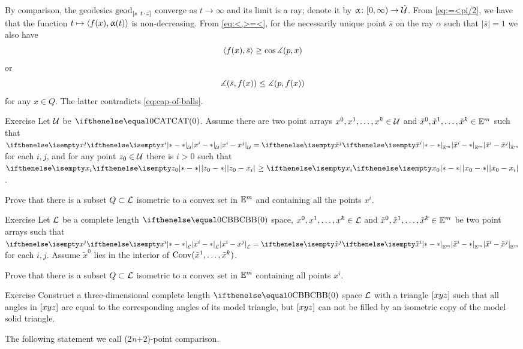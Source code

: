 By comparison,
the geodesics $\geod_{[s\ t\cdot z]}$ converge as $t\to\infty$
and its limit is a ray; denote it by $\alpha\:[0,\infty)\to \mathring{\spc{U}}$.
From \ref{eq:=<pi/2}, 
we have that the function $t\mapsto\<f(x),\alpha(t)\>$ is non-decreasing. 
From \ref{eq:<,>=<}, for
the necessarily unique point $\bar s$ on the ray $\alpha$ such that $|\bar s|=1$ we also have 
\[\<f(x),\bar s\>\ge \cos\mangle(p,x)\]
or
\[\mangle(\bar s,f(x))
\le 
\mangle(p,f(x))\]
for any $x\in Q$.
The latter contradicts \ref{eq:cap-of-balls}.
\qeds

\begin{thm}{Exercise}\label{ex:flat-in-CAT}
Let $\mathcal{U}$ be $\CAT0$. 
Assume there are two point arrays $x^0,x^1,\dots,x^\kay\in\spc{U}$ and $\tilde x^0,\tilde x^1,\dots,\tilde x^\kay\in\EE^m$ such that 
$\dist{x^i}{x^j}{\spc{U}}=\dist{\tilde x^i}{\tilde x^j}{\EE^m}$ for each $i,j$, and 
for any point $z_0\in\spc{U}$ there is $i>0$ such that $\dist{z_0}{x_i}{}\ge\dist{x_0}{x_i}{}$.

Prove that there is a subset $Q\subset\spc{L}$ isometric to a convex set in $\mathbb{E}^m$ and containing all the points $x^i$.
\end{thm}

\begin{thm}{Exercise}\label{ex:flat-in-CBB}
Let $\mathcal{L}$ be a complete length $\Alex{0}$ space,
$x^0,x^1,\dots,x^\kay\in\spc{L}$ and $\tilde x^0,\tilde x^1,\dots,\tilde x^\kay\in\EE^m$
be two point arrays such that 
$\dist{x^i}{x^j}{\spc{L}}=\dist{\tilde x^i}{\tilde x^j}{\EE^m}$ for each $i,j$.
Assume 
$\tilde x^0$ lies in the interior of $\Conv(\tilde x^1,\dots,\tilde x^\kay)$.

Prove that there is a subset $Q\subset\spc{L}$ isometric to a convex set in $\mathbb{E}^m$ containing all points $x^i$.
\end{thm}

{\sloppy 

\begin{thm}{Exercise} \label{ex:not-flat}
Construct  a three-dimensional complete length $\Alex0$ space $\mathcal{L}$ with a triangle 
$[{x}{y}{z}]$ such that all angles in $[{x}{y}{z}]$ are equal to the corresponding angles of its model triangle, but $[{x}{y}{z}]$  can not be filled by an isometric copy of the model solid triangle.
\end{thm}

}

The following statement we call (2\textit{n}+2)-point comparison.

